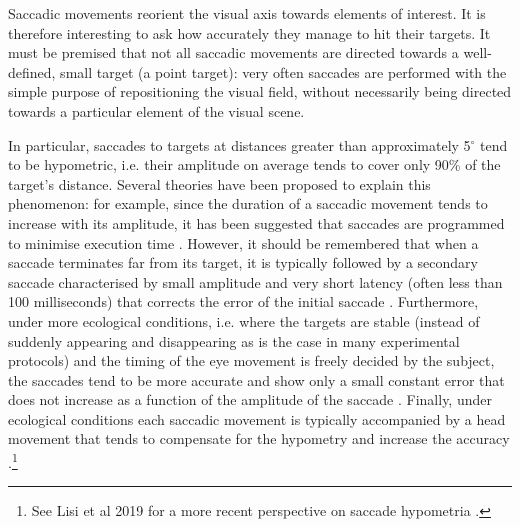 \documentclass[11pt]{article}
\begin{document}
Saccadic movements reorient the visual axis towards elements of interest. It is therefore interesting to ask how accurately they manage to hit their targets. It must be premised that not all saccadic movements are directed towards a well-defined, small target (a point target): very often saccades are performed with the simple purpose of repositioning the visual field, without necessarily being directed towards a particular element of the visual scene.

In particular, saccades to targets at distances greater than approximately 5$^{\circ}$ tend to be hypometric, i.e. their amplitude on average tends to cover only 90\% of the target's distance. Several theories have been proposed to explain this phenomenon: for example, since the duration of a saccadic movement tends to increase with its amplitude, it has been suggested that saccades are programmed to minimise execution time \cite{Harris1995}. However, it should be remembered that when a saccade terminates far from its target, it is typically followed by a secondary saccade characterised by small amplitude and very short latency (often less than 100 milliseconds) that corrects the error of the initial saccade \cite{Jacobs1987}. Furthermore, under more ecological conditions, i.e. where the targets are stable (instead of suddenly appearing and disappearing as is the case in many experimental protocols) and the timing of the eye movement is freely decided by the subject, the saccades tend to be more accurate and show only a small constant error that does not increase as a function of the amplitude of the saccade \cite{Collewijn1988}. Finally, under ecological conditions each saccadic movement is typically accompanied by a head movement that tends to compensate for the hypometry and increase the accuracy \cite{Guitton1987}.\footnote{\scriptsize{See Lisi et al 2019 for a more recent perspective on saccade hypometria \cite{Lisi2019}.}}
\end{document}
